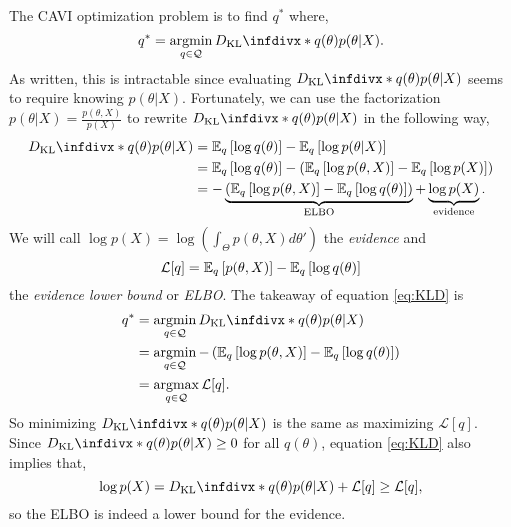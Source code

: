 The CAVI optimization problem is to find $q^*$ where,
\[q^* = \argmin_{q \in \mathcal{Q}}\KLD{q(\theta)}{p(\theta | X)}.  \]
As written, this is intractable since evaluating $\KLD{q(\theta)}{p(\theta | X)}$ seems to require knowing $p(\theta | X)$. Fortunately, we can use the factorization $p(\theta | X) = \frac{p(\theta,X)}{p(X)}$ to rewrite $\KLD{q(\theta)}{p(\theta | X)}$ in the following way,
\begin{align}
    \KLD{q(\theta)}{p(\theta | X)}&=\bbE_q\left[\log q(\theta)\right] - \bbE_q\left[\log p(\theta | X) \right]\nonumber \\
    &=\bbE_q\left[\log q(\theta)\right]-\left(\bbE_q\left[\log p(\theta,X)\right] - \bbE_q\left[\log p(X)\right]\right)\nonumber \\
    &=-\underbrace{\left(\bbE_q\left[\log p(\theta,X)\right] - \bbE_q \left[\log q(\theta)\right]\right)}_{\text{ELBO}} + \underbrace{\log p(X)}_{\text{evidence}}.\label{eq:KLD}
\end{align}
We will call $\log p(X) = \log \left(\int_\Theta p(\theta,X)d\theta'\right)$ the \emph{evidence} and 
$$
\mathcal{L}[q] = {\mathbb E}_q\left[p(\theta,X)\right] - {\mathbb E}_q\left[\log q(\theta)\right]
$$ 
the \emph{evidence lower bound} or \emph{ELBO}. The takeaway of equation \eqref{eq:KLD} is
\begin{align*}
    q^* &=\argmin_{q \in \calQ} \KLD{q(\theta)}{p(\theta | X)}\\
    &=\argmin_{q \in \calQ} -\left(\bbE_q\left[\log p(\theta,X)\right] - \bbE_q \left[\log q(\theta)\right]\right)\\
    &=\argmax_{q \in \calQ} \mathcal{L}[q].
\end{align*}
So minimizing $\KLD{q(\theta)}{p(\theta |  X)}$ is the same as maximizing $\mathcal{L}[q]$. Since $\KLD{q(\theta)}{p(\theta | X)} \ge 0$ for all $q(\theta)$,  equation \eqref{eq:KLD} also implies that, 
\[\log p(X) = \KLD{q(\theta)}{p(\theta | X)} + \mathcal{L}[q] \ge \mathcal{L}[q], \]
so the ELBO is indeed a lower bound for the evidence.

